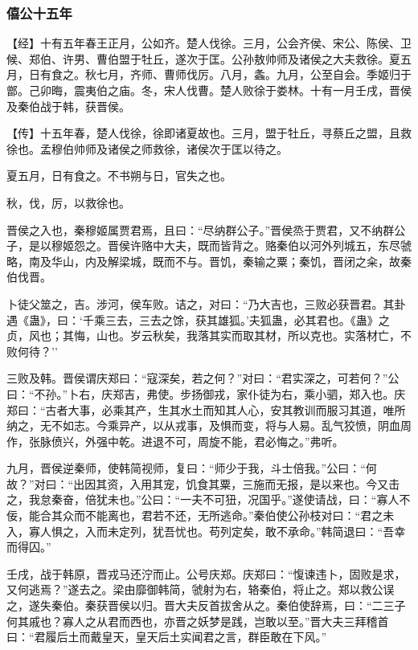 \documentclass[]{article}
\begin{document}
\hypertarget{header-n796}{%
\subsubsection{僖公十五年}\label{header-n796}}

【经】十有五年春王正月，公如齐。楚人伐徐。三月，公会齐侯、宋公、陈侯、卫候、郑伯、许男、曹伯盟于牡丘，遂次于匡。公孙敖帅师及诸侯之大夫救徐。夏五月，日有食之。秋七月，齐师、曹师伐厉。八月，螽。九月，公至自会。季姬归于鄫。己卯晦，震夷伯之庙。冬，宋人伐曹。楚人败徐于娄林。十有一月壬戌，晋侯及秦伯战于韩，获晋侯。

【传】十五年春，楚人伐徐，徐即诸夏故也。三月，盟于牡丘，寻蔡丘之盟，且救徐也。孟穆伯帅师及诸侯之师救徐，诸侯次于匡以待之。

夏五月，日有食之。不书朔与日，官失之也。

秋，伐，厉，以救徐也。

晋侯之入也，秦穆姬属贾君焉，且曰：``尽纳群公子。''晋侯烝于贾君，又不纳群公子，是以穆姬怨之。晋侯许赂中大夫，既而皆背之。赂秦伯以河外列城五，东尽虢略，南及华山，内及解梁城，既而不与。晋饥，秦输之粟；秦饥，晋闭之籴，故秦伯伐晋。

卜徒父筮之，吉。涉河，侯车败。诘之，对曰：``乃大吉也，三败必获晋君。其卦遇《蛊》，曰：`千乘三去，三去之馀，获其雄狐。'夫狐蛊，必其君也。《蛊》之贞，风也；其悔，山也。岁云秋矣，我落其实而取其材，所以克也。实落材亡，不败何待？''

三败及韩。晋侯谓庆郑曰：``寇深矣，若之何？''对曰：``君实深之，可若何？''公曰：``不孙。''卜右，庆郑吉，弗使。步扬御戎，家仆徒为右，乘小驷，郑入也。庆郑曰：``古者大事，必乘其产，生其水土而知其人心，安其教训而服习其道，唯所纳之，无不如志。今乘异产，以从戎事，及惧而变，将与人易。乱气狡愤，阴血周作，张脉偾兴，外强中乾。进退不可，周旋不能，君必悔之。''弗听。

九月，晋侯逆秦师，使韩简视师，复曰：``师少于我，斗士倍我。''公曰：``何故？''对曰：``出因其资，入用其宠，饥食其粟，三施而无报，是以来也。今又击之，我怠秦奋，倍犹未也。''公曰：``一夫不可狃，况国乎。''遂使请战，曰：``寡人不佞，能合其众而不能离也，君若不还，无所逃命。''秦伯使公孙枝对曰：``君之未入，寡人惧之，入而未定列，犹吾忧也。苟列定矣，敢不承命。''韩简退曰：``吾幸而得囚。''

壬戌，战于韩原，晋戎马还泞而止。公号庆郑。庆郑曰：``愎谏违卜，固败是求，又何逃焉？''遂去之。梁由靡御韩简，虢射为右，辂秦伯，将止之。郑以救公误之，遂失秦伯。秦获晋侯以归。晋大夫反首拔舍从之。秦伯使辞焉，曰：``二三子何其戚也？寡人之从君而西也，亦晋之妖梦是践，岂敢以至。''晋大夫三拜稽首曰：``君履后土而戴皇天，皇天后土实闻君之言，群臣敢在下风。''
\end{document}
